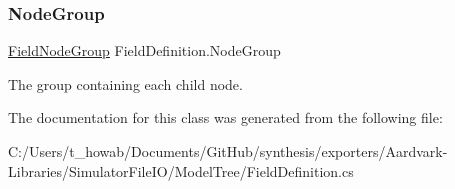 \subsubsection{\texorpdfstring{Node\+Group}{NodeGroup}}
{\footnotesize\ttfamily \hyperlink{class_field_node_group}{Field\+Node\+Group} Field\+Definition.\+Node\+Group\hspace{0.3cm}{\ttfamily [get]}}



The group containing each child node. 



The documentation for this class was generated from the following file\+:\begin{DoxyCompactItemize}
\item 
C\+:/\+Users/t\+\_\+howab/\+Documents/\+Git\+Hub/synthesis/exporters/\+Aardvark-\/\+Libraries/\+Simulator\+File\+I\+O/\+Model\+Tree/Field\+Definition.\+cs\end{DoxyCompactItemize}
